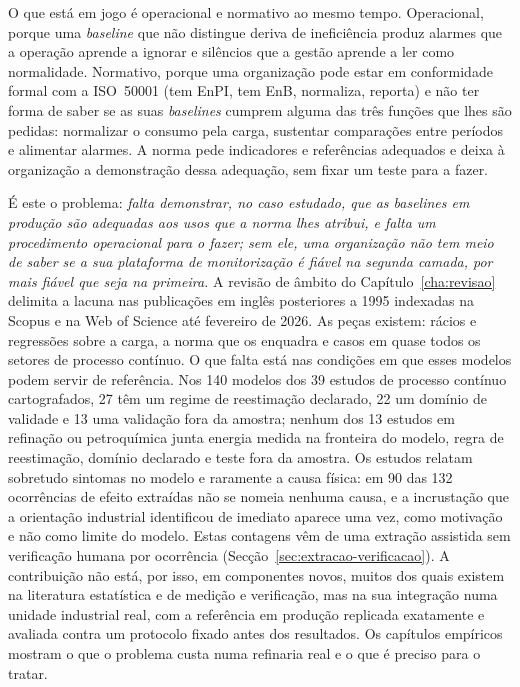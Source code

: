 O que está em jogo é operacional e normativo ao mesmo tempo.
Operacional, porque uma \emph{baseline} que não distingue deriva de
ineficiência produz alarmes que a operação aprende a ignorar e
silêncios que a gestão aprende a ler como normalidade. Normativo, porque
uma organização pode estar em conformidade formal com a ISO~50001 (tem
EnPI, tem EnB, normaliza, reporta) e não ter forma de saber se as
suas \emph{baselines} cumprem alguma das três funções que lhes são
pedidas: normalizar o consumo pela carga, sustentar comparações entre
períodos e alimentar alarmes. A norma pede indicadores e referências
adequados e deixa à organização a demonstração dessa adequação, sem fixar
um teste para a fazer.

É este o problema: \emph{falta demonstrar, no caso estudado, que as
\emph{baselines} em produção são adequadas aos usos que a norma lhes
atribui, e falta um procedimento operacional para o fazer; sem ele, uma
organização não tem meio de saber se a sua plataforma de monitorização é
fiável na segunda camada, por mais fiável que seja na primeira.} A
revisão de âmbito do Capítulo~\ref{cha:revisao} delimita a lacuna nas
publicações em inglês posteriores a 1995 indexadas na Scopus e na Web of
Science até fevereiro de 2026. As peças existem: rácios e regressões sobre a
carga, a norma que os enquadra e casos em quase todos os setores de processo
contínuo. O que falta está nas condições em que esses modelos podem servir
de referência. Nos 140 modelos dos 39 estudos de processo contínuo
cartografados, 27 têm um regime de reestimação declarado, 22 um domínio de
validade e 13 uma validação fora da amostra; nenhum dos 13 estudos em
refinação ou petroquímica junta energia medida na fronteira do modelo,
regra de reestimação, domínio declarado e teste fora da amostra. Os estudos
relatam sobretudo sintomas no modelo e raramente a causa física: em 90 das
132 ocorrências de efeito extraídas não se nomeia nenhuma causa, e a
incrustação que a orientação industrial identificou de imediato aparece
uma vez, como motivação e não como limite do modelo. Estas contagens vêm de
uma extração assistida sem verificação humana por ocorrência
(Secção~\ref{sec:extracao-verificacao}). A contribuição não está, por isso,
em componentes novos, muitos dos quais existem na literatura estatística e
de medição e verificação, mas na sua integração numa unidade industrial
real, com a referência em produção replicada exatamente e avaliada contra um
protocolo fixado antes dos resultados. Os capítulos empíricos mostram o que
o problema custa numa refinaria real e o que é preciso para o tratar.

